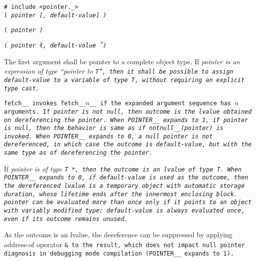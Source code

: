 
\tt{# include <pointer._>}\\

\s\s\s\s\tt{(} \it{pointer} [\tt{,} \it{default-value}] \tt{)}

\s\tt{(} \it{pointer} \tt{)}

\s\tt{(} \it{pointer} \l\tt{,} \it{default-value}\r\ \tt{)}


The first argument shall be pointer to a complete object type.
If \it{pointer} is an expression of type ``pointer to \tt{T}'',
then it shall be possible to assign \it{default-value} to a
variable of type \tt{T}, without requiring an explicit type cast.


\tt{fetch__} invokes \tt{fetch__}$n$\_\_ if the
expanded argument sequence has $n$ arguments.
If \it{pointer} is not null,
then outcome is the lvalue obtained on dereferencing the pointer.
When \tt{POINTER__} expands to \tt{1}, if \it{pointer} is null,
then the behavior is same as if \tt{notnull__(}\it{pointer}\tt{)} is invoked.
When \tt{POINTER__} expands to \tt{0}, a null pointer is not dereferenced,
in which case the outcome is \it{default-value},
but with the same type as of dereferencing the pointer.

If \it{pointer} is of type \tt{T *},
then the outcome is an lvalue of type \tt{T}.
When \tt{POINTER__} expands to \tt{0}, if \it{default-value} is used as the
outcome, then the dereferenced lvalue is a temporary object with automatic
storage duration, whose lifetime ends after the innermost enclosing block.
\it{pointer} can be evaluated more than once only if
 it points to an object with variably modified type;
\it{default-value} is always evaluated once, even if its outcome remains unused.

\note As the outcome is an lvalue, the dereference can be
suppressed by applying address-of operator \tt{&} to the result,
which does not impact null pointer diagnosis in debugging mode compilation
(\tt{POINTER__} expands to \tt{1}).
